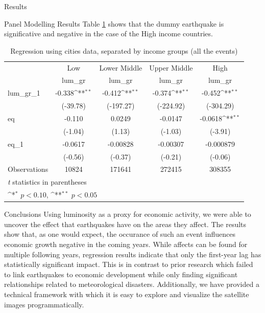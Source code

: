 \documentclass[12.5pt,fleqn,leqno,letterpaper]{article}
\begin{document}
\begin{section}{Results}
\begin{subsection}{Panel Modelling Results}
    Table \ref{tab6} shows that the dummy earthquake is significative and negative in the case of the High income countries. 
    \begin{table}[H]\centering
      \def\sym#1{\ifmmode^{#1}\else\(^{#1}\)\fi}
      \caption{Regression using cities data, separated by income groups (all the events)\label{tab6}}
      \begin{tabular}{l*{4}{c}}
        \hline\hline
        &\multicolumn{1}{c}{Low}&\multicolumn{1}{c}{Lower Middle}&\multicolumn{1}{c}{Upper Middle}&\multicolumn{1}{c}{High}\\
        &\multicolumn{1}{c}{lum\_gr}&\multicolumn{1}{c}{lum\_gr}&\multicolumn{1}{c}{lum\_gr}&\multicolumn{1}{c}{lum\_gr}\\
        \hline
        lum\_gr\_1            &      -0.338\sym{**}&      -0.412\sym{**}&      -0.374\sym{**}&      -0.452\sym{**}\\
                              &    (-39.78)        &   (-197.27)        &   (-224.92)        &   (-304.29)        \\
        [1em]
        eq    &      -0.110        &      0.0249        &     -0.0147        &     -0.0618\sym{**}\\
              &     (-1.04)        &      (1.13)        &     (-1.03)        &     (-3.91)        \\
        [1em]
        eq\_1  &     -0.0617        &    -0.00828        &    -0.00307        &   -0.000879        \\
               &     (-0.56)        &     (-0.37)        &     (-0.21)        &     (-0.06)        \\
        \hline
        Observations        &       10824        &      171641        &      272415        &      308355        \\
        \hline\hline
        \multicolumn{5}{l}{\footnotesize \textit{t} statistics in parentheses}\\
        \multicolumn{5}{l}{\footnotesize \sym{*} \(p<0.10\), \sym{**} \(p<0.05\)}\\
      \end{tabular}
    \end{table}
  \end{subsection}

  \begin{subsection}{Conclusions}
    Using luminosity as a proxy for economic activity, we were able to uncover the effect that earthquakes have on the areas they affect. The results show that, as one would expect, the occurance of such an event influences economic growth negative in the coming years. While affects can be found for multiple following years, regression results indicate that only the first-year lag has statistically significant impact. This is in contrast to prior research which failed to link earthquakes to economic development while only finding significant relationships related to meteorological disasters. Additionally, we have provided a technical framework with which it is easy to explore and visualize the satellite images programmatically.
  \end{subsection}


\end{section}
\end{document}
